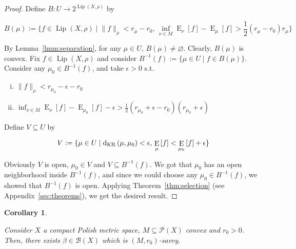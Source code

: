 \documentclass[11pt]{article}
\theoremstyle{definition}
\theoremstyle{plain}
\newtheorem{corollary}{Corollary}%
\newcommand{\N}[1]{\lVert #1 \rVert}
\DeclareMathOperator{\E}{E}
\newcommand{\PM}{\mathcal{P}}
\newcommand{\Lp}{{\operatorname{Lip}}}
\newcommand{\DKR}{\operatorname{d}_{\textnormal{KR}}}
\newcommand{\Gm}{\mathcal{B}}
\begin{document}
\begin{proof}

Define $B: U \rightarrow 2^{\Lp\left(X,\rho\right)}$ by

$$B\left(\mu\right):=\{f \in \Lp\left(X,\rho\right) \mid \N{f}_\rho < r_\mu - r_0,\, \inf_{\nu \in M} \E_\nu\left[f\right] - \E_\mu\left[f\right] > \frac{1}{2}\left(r_\mu - r_0\right) r_\mu\}$$

By Lemma~\ref{lmm:separation}, for any $\mu \in U$, $B\left(\mu\right) \ne \varnothing$. Clearly, $B\left(\mu\right)$ is convex. Fix $f \in \Lp\left(X,\rho\right)$ and consider $B^{-1}\left(f\right):=\{\mu \in U \mid f \in B\left(\mu\right)\}$. Consider any $\mu_0 \in B^{-1}\left(f\right)$, and take $\epsilon > 0$ s.t.

\begin{enumerate}[i.]

\item $\N{f}_\rho < r_{\mu_0}  - \epsilon - r_0$
\item $\inf_{\nu \in M} \E_\nu\left[f\right] - \E_{\mu_0}\left[f\right] -\epsilon > \frac{1}{2}\left(r_{\mu_0} + \epsilon  - r_0\right) \left(r_{\mu_0} + \epsilon\right)$

\end{enumerate}

Define $V \subseteq U$ by 

$$V := \{\mu \in U \mid \DKR\left(\mu,\mu_0\right) < \epsilon,\, \E_\mu\left[f\right] < \E_{\mu_0}\left[f\right] + \epsilon\}$$

Obviously $V$ is open, $\mu_0\in V$ and $V \subseteq B^{-1}\left(f\right)$. We got that $\mu_0$ has an open neighborhood inside $B^{-1}(f)$, and since we could choose any $\mu_0\in B^{-1}(f)$, we showed that $B^{-1}\left(f\right)$ is open. Applying Theorem~\ref{thm:selection} (see Appendix~\ref{sec:theorems}), we get the desired result.
\end{proof}

\begin{samepage}
\begin{corollary}
\label{crl:savvy}

Consider $X$ a compact Polish metric space, $M \subseteq \PM\left(X\right)$ convex and $r_0 > 0$. Then, there exists $\beta \in \Gm\left(X\right)$ which is $\left(M,r_0\right)$-savvy.

\end{corollary}
\end{samepage}
\end{document}
